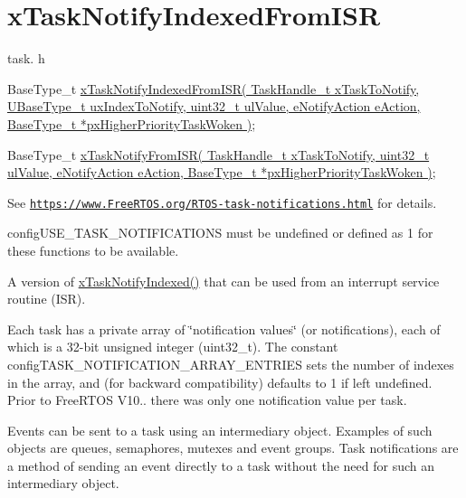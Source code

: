 \hypertarget{group__x_task_notify_indexed_from_i_s_r}{}\section{x\+Task\+Notify\+Indexed\+From\+I\+SR}
\label{group__x_task_notify_indexed_from_i_s_r}
task. h 
\begin{DoxyPre}BaseType\_t \hyperlink{externals_2freertos_2include_2task_8h_ab86169cb5493142a9e247e2cf2e583e2}{xTaskNotifyIndexedFromISR( TaskHandle\_t xTaskToNotify, UBaseType\_t uxIndexToNotify, uint32\_t ulValue, eNotifyAction eAction, BaseType\_t *pxHigherPriorityTaskWoken )};\end{DoxyPre}
 
\begin{DoxyPre}BaseType\_t \hyperlink{externals_2freertos_2include_2task_8h_a1ed9129068b96a909356bd0369c5ecb0}{xTaskNotifyFromISR( TaskHandle\_t xTaskToNotify, uint32\_t ulValue, eNotifyAction eAction, BaseType\_t *pxHigherPriorityTaskWoken )};\end{DoxyPre}


See \href{https://www.FreeRTOS.org/RTOS-task-notifications.html}{\tt https\+://www.\+Free\+R\+T\+O\+S.\+org/\+R\+T\+O\+S-\/task-\/notifications.\+html} for details.

config\+U\+S\+E\+\_\+\+T\+A\+S\+K\+\_\+\+N\+O\+T\+I\+F\+I\+C\+A\+T\+I\+O\+NS must be undefined or defined as 1 for these functions to be available.

A version of \hyperlink{externals_2freertos_2include_2task_8h_a0261e3cca34893bdfccbca1be2de93d5}{x\+Task\+Notify\+Indexed()} that can be used from an interrupt service routine (I\+SR).

Each task has a private array of \char`\"{}notification values\char`\"{} (or \textquotesingle{}notifications\textquotesingle{}), each of which is a 32-\/bit unsigned integer (uint32\+\_\+t). The constant config\+T\+A\+S\+K\+\_\+\+N\+O\+T\+I\+F\+I\+C\+A\+T\+I\+O\+N\+\_\+\+A\+R\+R\+A\+Y\+\_\+\+E\+N\+T\+R\+I\+ES sets the number of indexes in the array, and (for backward compatibility) defaults to 1 if left undefined. Prior to Free\+R\+T\+OS V10.. there was only one notification value per task.

Events can be sent to a task using an intermediary object. Examples of such objects are queues, semaphores, mutexes and event groups. Task notifications are a method of sending an event directly to a task without the need for such an intermediary object.

